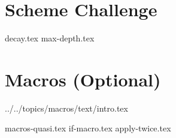 \documentclass{exam}
\begin{document}
\newpage
\section{Scheme Challenge}
\begin{questions}
{decay.tex}
{max-depth.tex}
\end{questions}

\newpage
\section{Macros (Optional)}
 {../../topics/macros/text/}{intro.tex}
\begin{questions}
{macros-quasi.tex}
{if-macro.tex}
{apply-twice.tex}
\end{questions}

\end{document}
